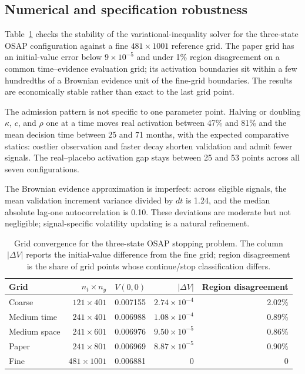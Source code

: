 \documentclass[11pt]{article}
\begin{document}
\subsection{Numerical and specification robustness}
\label{sec:robustness}

Table~\ref{tab:grid_convergence} checks the stability of the variational-inequality
solver for the three-state OSAP configuration against a fine
$481\times1001$ reference grid.  The paper grid has an initial-value error below
$9\times10^{-5}$ and under 1\% region disagreement on a common time--evidence
evaluation grid; its activation boundaries sit within a few hundredths of a Brownian
evidence unit of the fine-grid boundaries.  The results are economically stable rather than exact to the last
grid point.

The admission pattern is not specific to one parameter point.  Halving or doubling
$\kappa$, $c$, and $\rho$ one at a time moves real activation between 47\% and 81\%
and the mean decision time between 25 and 71 months, with the expected comparative
statics: costlier observation and faster decay shorten validation and admit fewer
signals.  The real--placebo activation gap stays between 25 and 53 points across all
seven configurations.

The Brownian evidence approximation is imperfect: across eligible signals, the mean
validation increment variance divided by $dt$ is 1.24, and the median absolute lag-one
autocorrelation is 0.10.  These deviations are moderate but not negligible;
signal-specific volatility updating is a natural refinement.

\begin{table}[t]
\centering
\caption{Grid convergence for the three-state OSAP stopping problem.  The column
$|\Delta V|$ reports the initial-value difference from the fine grid; region disagreement is the share of
grid points whose continue/stop classification differs.}
\label{tab:grid_convergence}
\begin{tabular}{lrrrr}
\toprule
Grid & $n_t\times n_y$ & $V(0,0)$ & $|\Delta V|$ & Region disagreement \\
\midrule
Coarse & $121\times401$ & 0.007155 & $2.74\times10^{-4}$ & 2.02\% \\
Medium time & $241\times401$ & 0.006988 & $1.08\times10^{-4}$ & 0.89\% \\
Medium space & $241\times601$ & 0.006976 & $9.50\times10^{-5}$ & 0.86\% \\
Paper & $241\times801$ & 0.006969 & $8.87\times10^{-5}$ & 0.90\% \\
Fine & $481\times1001$ & 0.006881 & 0 & 0 \\
\bottomrule
\end{tabular}
\end{table}
\end{document}
